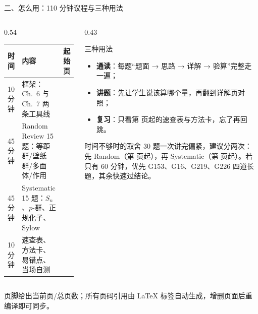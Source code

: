 \documentclass[aspectratio=169,10pt,fontset=none]{ctexbeamer}
\begin{document}
\begin{frame}[t]{二、怎么用：110 分钟议程与三种用法}
  \label{sec:agenda}
  \begin{columns}[T,onlytextwidth]
    \begin{column}{0.54\textwidth}
      \centering
      \scriptsize
      \setlength{\tabcolsep}{3pt}
      \renewcommand{\arraystretch}{1.2}
      \begin{tabular}{@{}l l r@{}}
        \toprule
        时间 & 内容 & 起始页\\
        \midrule
        10 分钟 & 框架：Ch.~6 与 Ch.~7 两条工具线 & \pageref{sec:framework1}\\
        45 分钟 & Random Review 15 题：等距群/壁纸群/多面体/作用 & \pageref{sec:random}\\
        45 分钟 & Systematic 15 题：$S_n$、$p$-群、正规化子、Sylow & \pageref{sec:sys}\\
        10 分钟 & 速查表、方法卡、易错点、当场自测 & \pageref{sec:answers}\\
        \bottomrule
      \end{tabular}
    \end{column}
    \begin{column}{0.43\textwidth}
      \begin{block}{\footnotesize 三种用法}
        \scriptsize
        \begin{itemize}\setlength{\itemsep}{1pt}
          \item \textbf{通读}：每题“题面 → 思路 → 详解 → 验算”完整走一遍；
          \item \textbf{讲题}：先让学生说该算哪个量，再翻到详解页对照；
          \item \textbf{复习}：只看第 \pageref{sec:answers} 页起的速查表与方法卡，忘了再回跳。
        \end{itemize}
      \end{block}
      \begin{alertblock}{\footnotesize 时间不够时的取舍}
        \scriptsize
        30 题一次讲完偏紧，建议分两次：先 Random（第 \pageref{sec:random} 页起），再 Systematic（第 \pageref{sec:sys} 页起）。若只有 60 分钟，优先 G153、G16、G219、G226 四道长题，其余快速过结论。
      \end{alertblock}
    \end{column}
  \end{columns}
  \vspace{0.2em}
  {\scriptsize\color{ink!70} 页脚给出当前页/总页数；所有页码引用由 \LaTeX{} 标签自动生成，增删页面后重编译即可同步。}
\end{frame}
\end{document}
